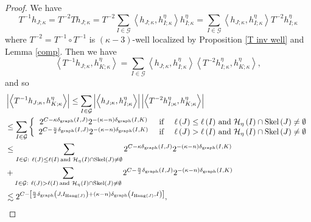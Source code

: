 \documentclass{amsart}%
\theoremstyle{plain}
\numberwithin{equation}{section}
\begin{document}
\begin{proof}
We have%
\[
T^{-1}h_{J;\kappa}=T^{-2}Th_{J;\kappa}=T^{-2}\sum_{I\in\mathcal{G}%
}\left\langle h_{J;\kappa},h_{I;\kappa}^{\eta}\right\rangle h_{I;\kappa}%
^{\eta}=\sum_{I\in\mathcal{G}}\left\langle h_{J;\kappa},h_{I;\kappa}^{\eta
}\right\rangle T^{-2}h_{I;\kappa}^{\eta}%
\]
where $T^{-2}=T^{-1}\circ T^{-1}$ is $\left(  \kappa-3\right)  $-well
localized by Proposition \ref{T inv well} and Lemma \ref{comp}. Then we have%
\[
\left\langle T^{-1}h_{J;\kappa},h_{K;\kappa}^{\eta}\right\rangle =\sum
_{I\in\mathcal{G}}\left\langle h_{J;\kappa},h_{I;\kappa}^{\eta}\right\rangle
\left\langle T^{-2}h_{I;\kappa}^{\eta},h_{K;\kappa}^{\eta}\right\rangle ,
\]
and so%
\begin{align*}
& \left\vert \left\langle T^{-1}h_{J;\kappa},h_{K;\kappa}^{\eta}\right\rangle
\right\vert \leq\sum_{I\in\mathcal{G}}\left\vert \left\langle h_{J;\kappa
},h_{I;\kappa}^{\eta}\right\rangle \right\vert \left\vert \left\langle
T^{-2}h_{I;\kappa}^{\eta},h_{K;\kappa}^{\eta}\right\rangle \right\vert \\
& \leq\sum_{I\in\mathcal{G}}\left\{
\begin{array}
[c]{ccc}%
2^{C-\kappa\delta_{\operatorname*{graph}}\left(  I,J\right)  }2^{-\left(
\kappa-n\right)  \delta_{\operatorname*{graph}}\left(  I,K\right)  } & \text{
if } & \ell\left(  J\right)  \leq\ell\left(  I\right)  \,\text{and
}\mathcal{H}_{\eta}\left(  I\right)  \cap\operatorname*{Skel}\left(  J\right)
\neq\emptyset\\
2^{C-\frac{n}{2}\delta_{\operatorname*{graph}}\left(  I,J\right)  }2^{-\left(
\kappa-n\right)  \delta_{\operatorname*{graph}}\left(  I,K\right)  } & \text{
if } & \ell\left(  J\right)  >\ell\left(  I\right)  \,\text{and }%
\mathcal{H}_{\eta}\left(  I\right)  \cap\operatorname*{Skel}\left(  J\right)
\neq\emptyset
\end{array}
\right.  \\
& \leq\sum_{I\in\mathcal{G}:\ \ell\left(  J\right)  \leq\ell\left(  I\right)
\,\text{and }\mathcal{H}_{\eta}\left(  I\right)  \cap\operatorname*{Skel}%
\left(  J\right)  \neq\emptyset}2^{C-\kappa\delta_{\operatorname*{graph}%
}\left(  I,J\right)  }2^{-\left(  \kappa-n\right)  \delta
_{\operatorname*{graph}}\left(  I,K\right)  }\\
& +\sum_{I\in\mathcal{G}:\ \ell\left(  J\right)  >\ell\left(  I\right)
\,\text{and }\mathcal{H}_{\eta}\left(  I\right)  \cap\operatorname*{Skel}%
\left(  J\right)  \neq\emptyset}2^{C-\frac{n}{2}\delta_{\operatorname*{graph}%
}\left(  I,J\right)  }2^{-\left(  \kappa-n\right)  \delta
_{\operatorname*{graph}}\left(  I,K\right)  }\\
& \lesssim2^{C-\left[  \frac{n}{2}\delta_{\operatorname*{graph}}\left(
J,I_{\operatorname*{Hang}\left(  J\right)  }\right)  +\left(  \kappa-n\right)
\delta_{\operatorname*{graph}}\left(  I_{\operatorname*{Hang}\left(  J\right)
},I\right)  \right]  },
\end{align*}



\end{proof}
\end{document}
